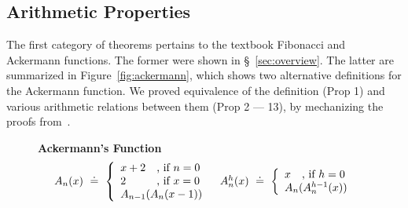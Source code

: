 \subsection{Arithmetic Properties} \label{subsec:arith} \label{subsec:ackermann}

The first category of theorems pertains to the textbook
Fibonacci and Ackermann functions.
%
The former were shown in \S~\ref{sec:overview}.
%
The latter are summarized in Figure~\ref{fig:ackermann},
which shows two alternative definitions for the
Ackermann function.
%
We proved equivalence of the definition (Prop 1)
and various arithmetic relations between
them (Prop 2 --- 13), by mechanizing the
proofs from~\cite{ackermann}.

\begin{figure}[t!]
\textbf{Ackermann's Function}
\[
\begin{array}{lr}
\ack{n}{x} \defeq
 \left\{
\begin{array}{l}
\setlength\arraycolsep{0pt}
\begin{array}{ll}
      x+2 &\quad \text{, if}\ n=0 \\
      2   &\quad \text{, if}\ x=0 \\
\end{array} \\
\ack{n-1}{\ack{n}{x-1}}
\end{array}
\right.
&
\iack{h}{n}{x} \defeq
 \left\{
\begin{array}{l}
      x \quad \text{, if}\ h=0 \\
      \ack{n}{\iack{h-1}{n}{x}}
\end{array}
\right.
\end{array}
 \]


\end{figure}
